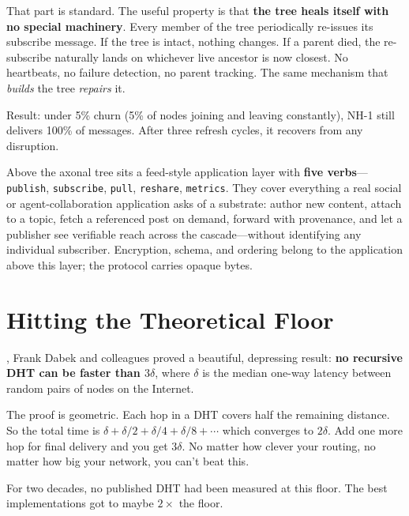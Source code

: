 \documentclass[nobib]{tufte-handout}
\begin{document}
That part is standard. The useful property is that \textbf{the tree heals itself with no special machinery}. Every member of the tree periodically re-issues its subscribe message. If the tree is intact, nothing changes. If a parent died, the re-subscribe naturally lands on whichever live ancestor is now closest. No heartbeats, no failure detection, no parent tracking. The same mechanism that \emph{builds} the tree \emph{repairs} it.

Result: under 5\% churn (5\% of nodes joining and leaving constantly), NH-1 still delivers 100\% of messages. After three refresh cycles, it recovers from any disruption.

Above the axonal tree sits a feed-style application layer with \textbf{five verbs}---\texttt{publish}, \texttt{subscribe}, \texttt{pull}, \texttt{reshare}, \texttt{metrics}. They cover everything a real social or agent-collaboration application asks of a substrate: author new content, attach to a topic, fetch a referenced post on demand, forward with provenance, and let a publisher see verifiable reach across the cascade---without identifying any individual subscriber. Encryption, schema, and ordering belong to the application above this layer; the protocol carries opaque bytes.

\section{Hitting the Theoretical Floor}

, Frank Dabek and colleagues proved a beautiful, depressing result: \textbf{no recursive DHT can be faster than $3\delta$}, where $\delta$ is the median one-way latency between random pairs of nodes on the Internet.

The proof is geometric. Each hop in a DHT covers half the remaining distance. So the total time is $\delta + \delta/2 + \delta/4 + \delta/8 + \cdots$ which converges to $2\delta$. Add one more hop for final delivery and you get $3\delta$. No matter how clever your routing, no matter how big your network, you can't beat this.

For two decades, no published DHT had been measured at this floor. The best implementations got to maybe $2\times$ the floor.
\end{document}
